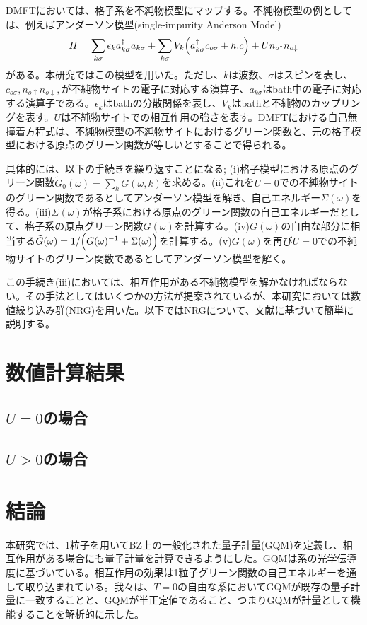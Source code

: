 \documentclass[12pt]{jsbook}
\begin{document}
DMFTにおいては、格子系を不純物模型にマップする。不純物模型の例としては、例えばアンダーソン模型(single-impurity Anderson Model)
\begin{eqnarray}
    H=\sum_{k\sigma}\epsilon_k a^{\dagger}_{k\sigma}a_{k\sigma} + \sum_{k\sigma}V_k\Bigl(a^{\dagger}_{k\sigma}c_{o\sigma}+h.c\Bigr) + Un_{o\uparrow}n_{o\downarrow}
\end{eqnarray}
がある。本研究ではこの模型を用いた。ただし、$k$は波数、$\sigma$はスピンを表し、$c_{o\sigma},n_{o\uparrow}n_{o\downarrow},$が不純物サイトの電子に対応する演算子、$a_{k\sigma}$はbath中の電子に対応する演算子である。$\epsilon_k$はbathの分散関係を表し、$V_k$はbathと不純物のカップリングを表す。$U$は不純物サイトでの相互作用の強さを表す。DMFTにおける自己無撞着方程式は、不純物模型の不純物サイトにおけるグリーン関数と、元の格子模型における原点のグリーン関数が等しいとすることで得られる。

具体的には、以下の手続きを繰り返すことになる;
(i)格子模型における原点のグリーン関数$\tilde{G}_{0}(\omega)=\sum_{k}G(\omega,k)$を求める。(ii)これを$U=0$での不純物サイトのグリーン関数であるとしてアンダーソン模型を解き、自己エネルギー$\Sigma(\omega)$を得る。(iii)$\Sigma(\omega)$が格子系における原点のグリーン関数の自己エネルギーだとして、格子系の原点グリーン関数$G(\omega)$を計算する。(iv)$G(\omega)$の自由な部分に相当する$\tilde{G}(\omega)=1/\Bigl(G(\omega)^{-1}+\Sigma(\omega)\Bigr)$を計算する。(v)$\tilde{G}(\omega)$を再び$U=0$での不純物サイトのグリーン関数であるとしてアンダーソン模型を解く。

この手続き(iii)においては、相互作用がある不純物模型を解かなければならない。その手法としてはいくつかの方法が提案されているが、本研究においては数値繰り込み群(NRG)を用いた。以下ではNRGについて、文献\cite{RevModPhys.80.395}に基づいて簡単に説明する。
\chapter{数値計算結果}
\section{$U=0$の場合}
\section{$U>0$の場合}
\chapter{結論}
本研究では、1粒子を用いてBZ上の一般化された量子計量(GQM)を定義し、相互作用がある場合にも量子計量を計算できるようにした。GQMは系の光学伝導度に基づいている。相互作用の効果は1粒子グリーン関数の自己エネルギーを通して取り込まれている。我々は、$T=0$の自由な系においてGQMが既存の量子計量に一致することと、GQMが半正定値であること、つまりGQMが計量として機能することを解析的に示した。
\end{document}
